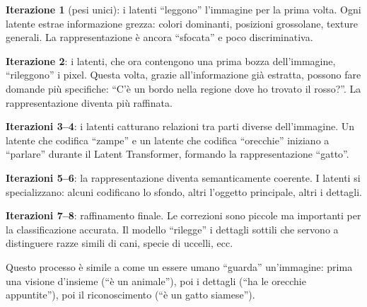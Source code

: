 \documentclass[12pt,a4paper]{article}
\begin{document}
\begin{examplebox}
\textbf{Iterazione 1} (pesi unici): i latenti ``leggono'' l'immagine per la prima volta. Ogni latente estrae informazione grezza: colori dominanti, posizioni grossolane, texture generali. La rappresentazione \`e ancora ``sfocata'' e poco discriminativa.

\textbf{Iterazione 2}: i latenti, che ora contengono una prima bozza dell'immagine, ``rileggono'' i pixel. Questa volta, grazie all'informazione gi\`a estratta, possono fare domande pi\`u specifiche: ``C'\`e un bordo nella regione dove ho trovato il rosso?''. La rappresentazione diventa pi\`u raffinata.

\textbf{Iterazioni 3--4}: i latenti catturano relazioni tra parti diverse dell'immagine. Un latente che codifica ``zampe'' e un latente che codifica ``orecchie'' iniziano a ``parlare'' durante il Latent Transformer, formando la rappresentazione ``gatto''.

\textbf{Iterazioni 5--6}: la rappresentazione diventa semanticamente coerente. I latenti si specializzano: alcuni codificano lo sfondo, altri l'oggetto principale, altri i dettagli.

\textbf{Iterazioni 7--8}: raffinamento finale. Le correzioni sono piccole ma importanti per la classificazione accurata. Il modello ``rilegge'' i dettagli sottili che servono a distinguere razze simili di cani, specie di uccelli, ecc.

Questo processo \`e simile a come un essere umano ``guarda'' un'immagine: prima una visione d'insieme (``\`e un animale''), poi i dettagli (``ha le orecchie appuntite''), poi il riconoscimento (``\`e un gatto siamese'').
\end{examplebox}
\end{document}
